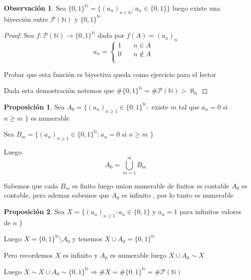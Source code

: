 \documentclass[12pt]{article}
\newcommand{\n}{\aleph_{0}}
\newcommand{\N}{\mathbb{N}}
\newcommand{\Ra}{\Rightarrow}
\newcommand{\ra}{\rightarrow}
\theoremstyle{definition}
\newtheorem*{remark}{Observación}
\newtheorem{prop}{Proposición}
\begin{document}
\begin{remark}
  Sea $\{0,1\}^{\N} = \{(a_{n})_{n \in \N} : a_{n} \in \{0,1\}\}$ luego existe una biyección entre $\mathcal{P}(\N)$ y $\{0,1\}^{\N}$
  
  \begin{proof}
    Sea $f: \mathcal{P}(\N) \ra \{0,1\}^{\N}$ dada por $f(A) = (a_{n})_{n}$
  \[
    a_{n} =
     \begin{cases}
       \text{$1$} &\quad\text{$n \in A$ }\\
       \text{$0$} &\quad\text{$n \notin A$} \\
     \end{cases}
\]

\noindent
Probar que esta función es biyectiva queda como ejercicio para el lector

\noindent
Dada esta demostración notemos que $\# \{0,1\}^{\N} = \# \mathcal{P}(\N) > \n$
  \end{proof}
\end{remark}

\begin{prop}
  Sea $A_{0} = \{(a_{n})_{n \geq 1} \in \{0,1\}^{\N} :$ existe $m$ tal que $a_{n} = 0$ si $ n \geq m$ $\}$ es numerable

  Sea $B_{m} = \{(a_{n})_{n \geq 1} \in \{0,1\}^{\N} : a_{n} = 0 $ si $ n \geq m$ $\}$

Luego $$A_{0} = \bigcup_{m = 1}^{\infty} B_{m}$$ 

Sabemos que cada $B_{m}$ es finito luego union numerable de finitos es contable $A_{0}$ es contable, pero ademas sabemos que $A_{0}$ es infinito , por lo tanto es numerable

\end{prop}

\begin{prop}
 Sea $X = \{(a_{n})_{n \geq 1} : a_{n} \in \{0,1\}$ y $ a_{n} = 1 $ para infinitos valores de $ n$ $\}$

 Luego $X = \{0,1\}^{\N} \setminus A_{0}$ y tenemos $X \cup A_{0} = \{0,1\}^{\N}$ 

 Pero recordemos $X$ es infinito y $A_{0}$ es numerable luego $X \cup A_{0} \sim X$

 Luego $X \sim X \cup A_{0} \sim \{0,1\}^{\N} \Ra \# X = \# \{0,1\}^{\N} = \# \mathcal{P}(\N)$
\end{prop}
\end{document}
